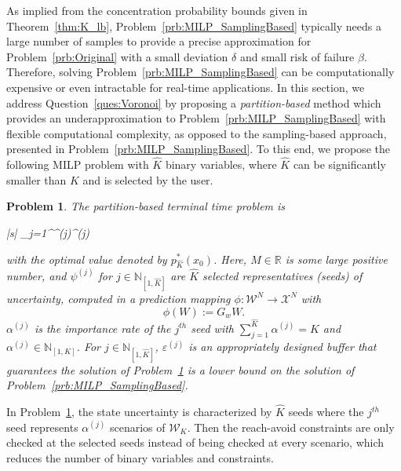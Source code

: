 \documentclass[11pt,letterpaper]{article}
\newtheorem{problem}{Problem}
\newcommand{\N}{\mathbb{N}}
\newcommand{\U}{\mathcal{U}}
\newcommand{\W}{\mathcal{W}}
\newcommand{\X}{\mathcal{X}}
\begin{document}
	As implied from the concentration probability bounds given in Theorem~\ref{thm:K_lb}, Problem~\ref{prb:MILP_SamplingBased} typically needs a large number of samples to provide a precise approximation for Problem~\ref{prb:Original} with a small deviation $\delta$ and small risk of failure $\beta$. Therefore, solving Problem~\ref{prb:MILP_SamplingBased} can be computationally expensive or even intractable for real-time applications. In this section, we address Question~\ref{ques:Voronoi} by proposing a \emph{partition-based} method which provides an underapproximation to Problem~\ref{prb:MILP_SamplingBased} with flexible computational complexity, as opposed to  the sampling-based approach, presented in Problem~\ref{prb:MILP_SamplingBased}. To this end, we propose the following MILP problem with $\hat{K}$ binary variables, where $\hat{K}$ can be significantly smaller than $K$ and is selected by the user. 
	
	\begin{problem} \label{prb:MILP_truncated} The partition-based terminal time problem is
 \vspace{-3mm}   
		\begin{maxi*}|s|
			{\substack{U\in\U^N 
					}}{\sum_{j=1}^{}\alpha^{(j)}^{(j)}}{}{}%
			\addConstraint{\hat{X}^{(j)}}{= G_{x}x_{0} + G_{u} U + \psi^{(j)},}{\ j\in \N_{[1,\hat{K}]}}
			\addConstraint{F\hat{X}^{(j)}}{\leq h -\varepsilon^{(j)}+ M(1-\hat{z}^{(j)})\mathbf{1},}{\ j\in \N_{[1,\hat{K}]}}
			\addConstraint{\hat{z}^{(j)}}{\in\{0,1\},}{\ j\in \N_{[1,\hat{K}]}}	\end{maxi*}
\hspace{-2mm} with the optimal value denoted by $p_{\hat{K}}^{\ast}(x_0)$. 
        Here, $M \in \mathbb{R}$ is some large positive number, and $\psi^{(j)}$ for $j\in\N_{[1,\hat{K}]}$ are $\hat{K}$ selected representatives  (seeds) of uncertainty, computed in a prediction mapping $\phi:\W^{N}\rightarrow \X^{N}$ with $$\phi(W):=G_{w}W.$$ $\alpha^{(j)}$ is the importance rate of the $j^{th}$ seed with $\sum_{j=1}^{\hat{K}}\alpha^{(j)}=K$ and $\alpha^{(j)}\in\N_{[1,K]}$. For $j\in\N_{[1,\hat{K}]}$, $\varepsilon^{(j)}$ is an appropriately designed buffer that guarantees the solution of  Problem~\ref{prb:MILP_truncated} is a lower bound on the solution of Problem~\ref{prb:MILP_SamplingBased}.
	\end{problem}
	
	In Problem~\ref{prb:MILP_truncated}, the state uncertainty is characterized by $\hat{K}$ seeds where the $j^{th}$ seed represents $\alpha^{(j)}$ scenarios of $\W_{K}$. Then the reach-avoid constraints are only checked at the selected seeds instead of being checked at every scenario, which reduces the number of binary variables and constraints. 
	
\end{document}
